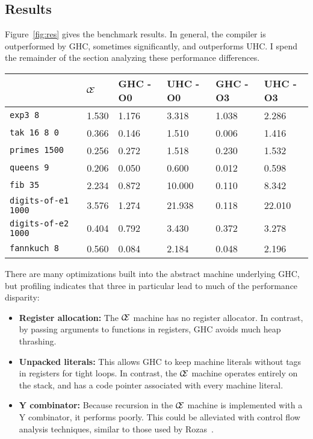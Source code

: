 \subsection{Results} \label{sec:res}

Figure~\ref{fig:res} gives the benchmark results.  In general, the compiler is
outperformed by GHC, sometimes significantly, and outperforms UHC. I spend the
remainder of the section analyzing these performance differences.

\begin{figure*}
\centering
\begin{tabularx}{\textwidth}{l | X | X | X | X | X}
& $\mathcal{\mathcal{C} \mskip -4mu \mathcal{E}}$ & GHC -O0 & UHC -O0 & GHC -O3 & UHC -O3 \\
\hline
\texttt{exp3 8} & 1.530 & 1.176 & 3.318 & 1.038 & 2.286 \\
\texttt{tak 16 8 0} & 0.366 & 0.146 & 1.510 & 0.006 & 1.416 \\
\texttt{primes 1500} & 0.256 & 0.272 & 1.518 & 0.230 & 1.532 \\
\texttt{queens 9} & 0.206 & 0.050 & 0.600 & 0.012 & 0.598 \\
\texttt{fib 35} & 2.234 & 0.872 & 10.000 & 0.110 & 8.342 \\
\texttt{digits-of-e1 1000} & 3.576 & 1.274 & 21.938 & 0.118 & 22.010 \\
\texttt{digits-of-e2 1000} & 0.404 & 0.792 & 3.430 & 0.372 & 3.278 \\
\texttt{fannkuch 8} & 0.560 & 0.084 & 2.184 & 0.048 & 2.196 \\
\end{tabularx}
\caption{Machine Literals Benchmark Results. Measurement is wall clock time,
units are seconds. Times averaged over 5 runs ($\sigma < 20\%$).}
\label{fig:res}
\end{figure*}

There are many optimizations built into the abstract machine underlying GHC,
but profiling indicates that three in particular lead to much of the performance
disparity: 

\begin{itemize}
\item \textbf{Register allocation:} The $\mathcal{\mathcal{C} \mskip -4mu \mathcal{E}}$ machine has no register
allocator. In contrast, by passing arguments to functions in registers, GHC
avoids much heap thrashing.
\item \textbf{Unpacked literals:} This allows GHC to keep machine literals
without tags in registers for tight loops. In contrast, the $\mathcal{\mathcal{C} \mskip -4mu \mathcal{E}}$
machine operates entirely on the stack, and has a code pointer associated with
every machine literal. 
\item \textbf{Y combinator:} Because recursion in the $\mathcal{\mathcal{C} \mskip -4mu \mathcal{E}}$ machine is
implemented with a Y combinator, it performs poorly. This could be alleviated
with control flow analysis techniques, similar to those used by Rozas~\cite{rozas1992taming}. 
\end{itemize}

